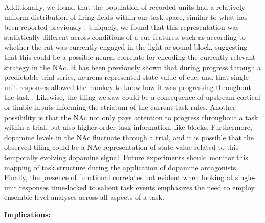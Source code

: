 \documentclass[11pt]{article}
\let\cite=\citep
\begin{document}
{Additionally, we found that the population of recorded units had a relatively uniform distribution of firing fields within our task space, similar to what has been reported previously \cite{Berke2009,Lansink2012,Shidara1998}. Uniquely, we found that this representation was statistically different across conditions of a cue features, such as according to whether the rat was currently engaged in the light or sound block, suggesting that this could be a possible neural correlate for encoding the currently relevant strategy in the NAc. It has been previously shown that during progress through a predictable trial series, neurons represented state value of cue, and that single-unit responses allowed the monkey to know how it was progressing throughout the task \cite{Shidara1998}. Likewise, the tiling we saw could be a consequence of upstream cortical or limbic inputs informing the striatum of the current task rules. Another possibility is that the NAc not only pays attention to progress throughout a task within a trial, but also higher-order task information, like blocks. Furthermore, dopamine levels in the NAc fluctuate through a trial, and it is possible that the observed tiling could be a NAc-representation of state value related to this temporally evolving dopamine signal. Future experiments should monitor this mapping of task structure during the application of dopamine antagonists. Finally, the presence of functional correlates not evident when looking at single-unit responses time-locked to salient task events emphasizes the need to employ ensemble level analyses across all aspects of a task.

{\bf Implications:}

}
\end{document}
